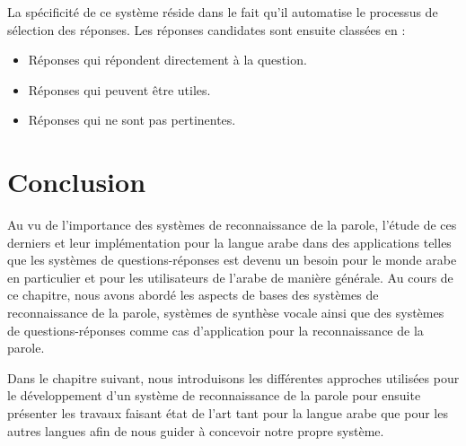 La spécificité de ce système réside dans le fait qu'il automatise le processus de sélection des réponses. Les réponses candidates sont ensuite classées en :
\begin{itemize}
    \item Réponses qui répondent directement à la question.
    \item Réponses qui peuvent être utiles.
    \item Réponses qui ne sont pas pertinentes.
\end{itemize}


\section{Conclusion}
Au vu de l'importance des systèmes de reconnaissance de la parole, l'étude de ces derniers et leur implémentation pour la langue arabe dans des applications telles que les systèmes de questions-réponses est devenu un besoin pour le monde arabe en particulier et pour les utilisateurs de l'arabe de manière générale. Au cours de ce chapitre, nous avons abordé les aspects de bases des systèmes de reconnaissance de la parole, systèmes de synthèse vocale ainsi que des systèmes de questions-réponses comme cas d'application pour la reconnaissance de la parole.

Dans le chapitre suivant, nous introduisons les différentes approches utilisées pour le développement d'un système de reconnaissance de la parole pour ensuite présenter les travaux faisant état de l'art tant pour la langue arabe que pour les autres langues afin de nous guider à concevoir notre propre système.

